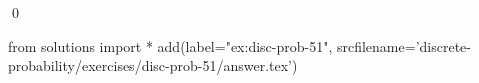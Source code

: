 
\begin{ex} 
  \label{ex:disc-prob-51}
  
  \qed
\end{ex} 
\begin{python0}
from solutions import *
add(label="ex:disc-prob-51",
    srcfilename='discrete-probability/exercises/disc-prob-51/answer.tex') 
\end{python0}

